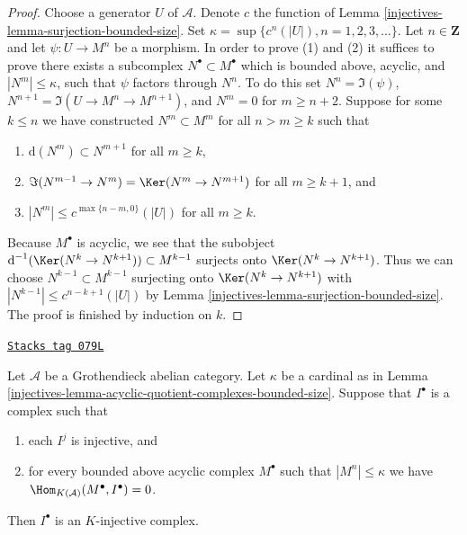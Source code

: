 \begin{proof}

Choose a generator $U$ of $\mathcal{A}$. Denote $c$ the function of
Lemma \ref{injectives-lemma-surjection-bounded-size}.
Set $\kappa = \sup \{c^n(|U|), n = 1, 2, 3, \ldots\}$.
Let $n \in \mathbf{Z}$ and let $\psi : U \to M^n$ be a morphism.
In order to prove (1) and (2) it suffices to prove there exists a subcomplex
$N^\bullet \subset M^\bullet$ which is bounded above, acyclic, and
$|N^m| \leq \kappa$, such that $\psi$ factors through $N^n$.
To do this set $N^n = \Im(\psi)$, $N^{n + 1} = \Im(U \to M^n \to M^{n + 1})$,
and $N^m = 0$ for $m \geq n + 2$.
Suppose for some $k \leq n$ we have constructed $N^m \subset M^m$
for all $n > m \geq k$ such that
\begin{enumerate}
\item $\text{d}(N^m) \subset N^{m + 1}$ for all $m \geq k$,
\item $\Im(N^{m - 1} \to N^m) = \Ker(N^m \to N^{m + 1})$ for
all $m \geq k + 1$, and
\item $|N^m| \leq c^{\max\{n - m, 0\}}(|U|)$ for all $m \geq k$.
\end{enumerate}
Because $M^\bullet$ is acyclic, we see that the subobject
$\text{d}^{-1}(\Ker(N^k \to N^{k + 1})) \subset M^{k - 1}$ surjects onto
$\Ker(N^k \to N^{k + 1})$. Thus we can choose $N^{k - 1} \subset M^{k - 1}$
surjecting onto $\Ker(N^k \to N^{k + 1})$ with
$|N^{k - 1}| \leq c^{n - k + 1}(|U|)$ by
Lemma \ref{injectives-lemma-surjection-bounded-size}. The proof is finished by
induction on $k$.
\end{proof}

\begin{lemma}
\label{injectives-lemma-characterize-K-injective}
\href{https://stacks.math.columbia.edu/tag/079L}{\texttt{Stacks tag 079L}}

Let $\mathcal{A}$ be a Grothendieck abelian category.
Let $\kappa$ be a cardinal as in
Lemma \ref{injectives-lemma-acyclic-quotient-complexes-bounded-size}.
Suppose that $I^\bullet$ is a complex such that
\begin{enumerate}
\item each $I^j$ is injective, and
\item for every bounded above acyclic complex $M^\bullet$
such that $|M^n| \leq \kappa$
we have $\Hom_{K(\mathcal{A})}(M^\bullet, I^\bullet) = 0$.
\end{enumerate}
Then $I^\bullet$ is an $K$-injective complex.
\end{lemma}

